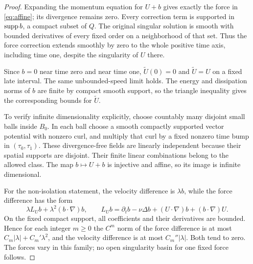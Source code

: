\begin{proof}
Expanding the momentum equation for $U+b$ gives exactly the force in
\eqref{eq:affine}; its divergence remains zero. Every correction term is supported in $\operatorname{supp} b$, a compact subset of $Q$. The original singular solution is smooth with bounded derivatives of every fixed order on a neighborhood of that set. Thus the force correction extends smoothly by zero to the whole positive time axis, including time one, despite the singularity of $U$ there.

Since $b=0$ near time zero and near time one,
$\widetilde U(0)=0$ and $\widetilde U=U$ on a fixed late interval.
The same unbounded-speed limit holds. The energy and dissipation norms of $b$ are finite by compact smooth support, so the triangle inequality gives the corresponding bounds for $\widetilde U$.

To verify infinite dimensionality explicitly, choose countably many disjoint small balls inside $B_0$. In each ball choose a smooth compactly supported vector potential with nonzero curl, and multiply that curl by a fixed nonzero time bump in $(\tau_0,\tau_1)$. These divergence-free fields are linearly independent because their spatial supports are disjoint. Their finite linear combinations belong to the allowed class. The map $b\mapsto U+b$ is injective and affine, so its image is infinite dimensional.

For the non-isolation statement, the velocity difference is $\lambda b$, while the force difference has the form
\[
 \lambda L_U b+\lambda^2(b\cdot\nabla)b,\qquad
 L_Ub=\partial_tb-\nu\Delta b+(U\cdot\nabla)b+(b\cdot\nabla)U.
\]
On the fixed compact support, all coefficients and their derivatives are bounded. Hence for each integer $m\ge0$ the $C^m$ norm of the force difference is at most $C_m|\lambda|+C_m'\lambda^2$, and the velocity difference is at most $C_m''|\lambda|$. Both tend to zero. The forces vary in this family; no open singularity basin for one fixed force follows.
\end{proof}


